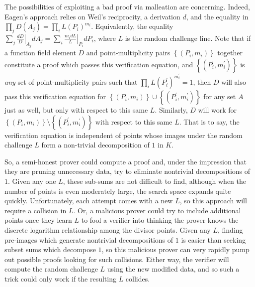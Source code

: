 \documentclass{article}
\theoremstyle{definition}
\newcommand{\6}{\mathbf}
\newcommand{\7}{\mathcal}
\begin{document}
The possibilities of exploiting a bad proof via malleation are concerning. Indeed, Eagen's approach relies on Weil's reciprocity, a derivation $d$, and the equality in $\prod_j D(A_j) = \prod_i L(P_i)^{m_i}$. Equivalently, the equality $\sum_j \left.\frac{dD}{D}\right|_{A_j} dA_j = \sum_i \left. \frac{m_i dL}{L}\right|_{P_i} dP_i$, where $L$ is the random challenge line. Note that if a function field element $D$ and point-multiplicity pairs $\left\{(P_i, m_i)\right\}$ together constitute a proof which passes this verification equation, and $\left\{(P^\prime_i, m^\prime_i)\right\}$ is \textit{any} set of point-multiplicity pairs such that $\prod_i L(P_i^\prime)^{m_i^\prime} = 1$, then $D$ will also pass this verification equation for $\left\{(P_i, m_i)\right\} \cup \left\{(P^\prime_i, m^\prime_i)\right\}$ for any set $A$ just as well, but only with respect to this same $L$. 
Similarly, $D$ will work for $\left\{(P_i, m_i)\right\} \setminus \left\{(P^\prime_i, m^\prime_i)\right\}$ with respect to this same $L$.
That is to say, the verification equation is independent of points whose images under the random challenge $L$ form a non-trivial decomposition of $1$ in $K$. 

So, a semi-honest prover could compute a proof and, under the impression that they are pruning unnecessary data, try to eliminate nontrivial decompositions of $1$. Given any one $L$, these sub-sums are not difficult to find, although when the number of points is even moderately large, the search space expands quite quickly. Unfortunately, each attempt comes with a new $L$, so this approach will require a collision in $L$. Or, a malicious prover could try to include additional points once they learn $L$ to fool a verifier into thinking the prover knows the discrete logarithm relationship among the divisor points. Given any $L$, finding pre-images which generate nontrivial decompositions of $1$ is easier than seeking subset sums which decompose $1$, so this malicious prover can very rapidly pump out possible proofs looking for such collisions. Either way, the verifier will compute the random challenge $L$ using the new modified data, and so such a trick could only work if the resulting $L$ collides.

\end{document}
